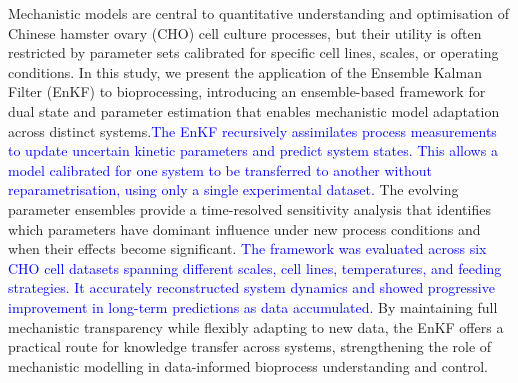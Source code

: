 Mechanistic models are central to quantitative understanding and optimisation of Chinese hamster ovary (CHO) cell culture processes, but their utility is often restricted by parameter sets calibrated for specific cell lines, scales, or operating conditions. In this study, we present the application of the Ensemble Kalman Filter (EnKF) to bioprocessing, introducing an  ensemble-based framework for dual state and parameter estimation that enables mechanistic model adaptation across distinct systems.\textcolor{blue}{The EnKF recursively assimilates process measurements to update uncertain kinetic parameters and predict system states. This allows a model calibrated for one system to be transferred to another without reparametrisation, using only a single experimental dataset.} The evolving parameter ensembles provide a time-resolved sensitivity analysis that identifies which parameters have dominant influence under new process conditions and when their effects become significant. \textcolor{blue}{The framework was evaluated across six CHO cell datasets spanning different scales, cell lines, temperatures, and feeding strategies. It accurately reconstructed system dynamics and showed progressive improvement in long-term predictions as data accumulated.} By maintaining full mechanistic transparency while flexibly adapting to new data, the EnKF offers a practical route for knowledge transfer across systems, strengthening the role of mechanistic modelling in data-informed bioprocess understanding and control.


